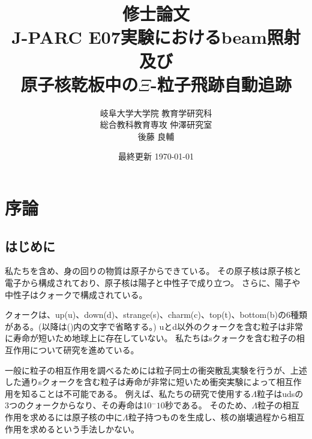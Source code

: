 \documentclass[12pt,a4paper]{jarticle}
\begin{document}
\begin{titlepage}
\title{\vspace{60mm} \LARGE 修士論文\vspace{10mm}\\J-PARC E07実験におけるbeam照射及び\\原子核乾板中の$\Xi$-粒子飛跡自動追跡}
\author{\Large 岐阜大学大学院 教育学研究科 \\ \vspace{5mm}
\Large 総合教科教育専攻 仲澤研究室 \\ \vspace{5mm}
\LARGE 後藤 良輔}
\date{最終更新 \today}
\maketitle
\thispagestyle{empty} %
\end{titlepage}

\thispagestyle{empty} %
\tableofcontents
\newpage
\section{序論}
\subsection{はじめに}
私たちを含め、身の回りの物質は原子からできている。
その原子核は原子核と電子から構成されており、原子核は陽子と中性子で成り立つ。
さらに、陽子や中性子はクォークで構成されている。
\par
クォークは、up(u)、down(d)、strange(s)、charm(c)、top(t)、bottom(b)の6種類がある。(以降は()内の文字で省略する。)
uとd以外のクォークを含む粒子は非常に寿命が短いため地球上に存在していない。
私たちはsクォークを含む粒子の相互作用について研究を進めている。
\par
一般に粒子の相互作用を調べるためには粒子同士の衝突散乱実験を行うが、上述した通りsクォークを含む粒子は寿命が非常に短いため衝突実験によって相互作用を知ることは不可能である。
例えば、私たちの研究で使用する$\Lambda$粒子はudsの3つのクォークからなり、その寿命は10$^-10$秒である。
そのため、$\Lambda$粒子の相互作用を求めるには原子核の中に$\Lambda$粒子持つものを生成し、核の崩壊過程から相互作用を求めるという手法しかない。
\end{document}
